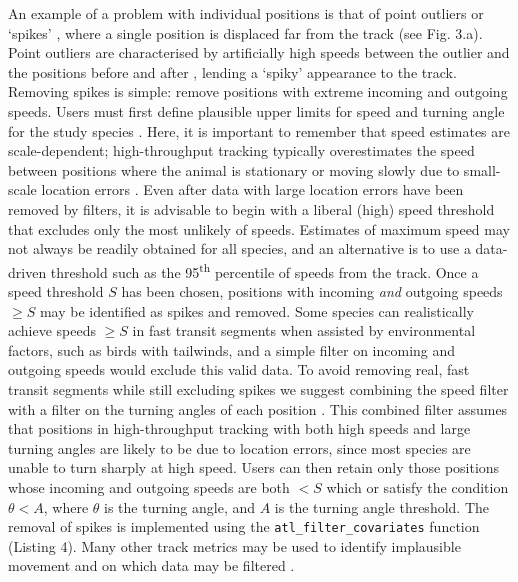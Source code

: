 \documentclass[10pt,paper=a4,headings=standardclasses
]{scrartcl}
\begin{document}
An example of a problem with individual positions is that of point outliers or `spikes' \citep{bjorneraas2010}, where a single position is displaced far from the track (see Fig. 3.a).
Point outliers are characterised by artificially high speeds between the outlier and the positions before and after \citep[called incoming and outgoing speed, respectively][]{bjorneraas2010}, lending a `spiky' appearance to the track.
Removing spikes is simple: remove positions with extreme incoming and outgoing speeds.
Users must first define plausible upper limits for speed and turning angle for the study species \citep{calenge2009, seidel2018}.
Here, it is important to remember that speed estimates are scale-dependent; high-throughput tracking typically overestimates the speed between positions where the animal is stationary or moving slowly due to small-scale location errors \citep{ranacher2016, noonan2019}. 
Even after data with large location errors have been removed by filters, it is advisable to begin with a liberal (high) speed threshold that excludes only the most unlikely of speeds.
Estimates of maximum speed may not always be readily obtained for all species, and an alternative is to use a data-driven threshold such as the 95\textsuperscript{th} percentile of speeds from the track.
Once a speed threshold $S$ has been chosen, positions with incoming \textit{and} outgoing speeds $\geq S$ may be identified as spikes and removed.
Some species can realistically achieve speeds $\geq S$ in fast transit segments when assisted by environmental factors, such as birds with tailwinds, and a simple filter on incoming and outgoing speeds would exclude this valid data.
To avoid removing real, fast transit segments while still excluding spikes we suggest combining the speed filter with a filter on the turning angles of each position \citep[see][]{calenge2009}.
This combined filter assumes that positions in high-throughput tracking with both high speeds and large turning angles are likely to be due to location errors, since most species are unable to turn sharply at high speed.
Users can then retain only those positions whose incoming and outgoing speeds are both $< S$ which or satisfy the condition $\theta < A$, where $\theta$ is the turning angle, and $A$ is the turning angle threshold.
The removal of spikes is implemented using the \texttt{atl\_filter\_covariates} function (Listing 4).
Many other track metrics may be used to identify implausible movement and on which data may be filtered \citep{seidel2018}.
\end{document}
